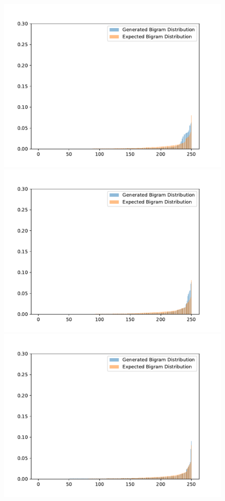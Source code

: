 \begin{figure}[H]
	\includegraphics[width=\linewidth]{img/plots/reddit/bigram_distribution_comparison_step_500000.pdf}
	\centering
	\small
	\endminipage\hfill
	\includegraphics[width=\linewidth]{img/plots/reddit/bigram_distribution_comparison_step_1000000.pdf}
	\centering
	\small
	\endminipage\hfill
	\includegraphics[width=\linewidth]{img/plots/reddit/bigram_distribution_comparison_step_1500000.pdf}

\end{figure}
